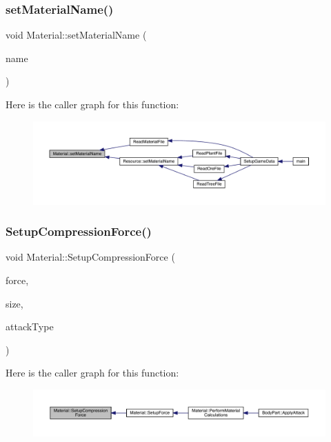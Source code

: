 \subsubsection{\texorpdfstring{set\+Material\+Name()}{setMaterialName()}}
{\footnotesize\ttfamily void Material\+::set\+Material\+Name (\begin{DoxyParamCaption}\item[{std\+::string}]{name }\end{DoxyParamCaption})}

Here is the caller graph for this function\+:
\nopagebreak
\begin{figure}[H]
\begin{center}
\leavevmode
\includegraphics[width=350pt]{class_material_ab73b88e094cf38d28f9addfd12357b04_icgraph}
\end{center}
\end{figure}
\mbox{\label{class_material_a9fa7b190d0621069612e848150e780ee}} 
\subsubsection{\texorpdfstring{Setup\+Compression\+Force()}{SetupCompressionForce()}}
{\footnotesize\ttfamily void Material\+::\+Setup\+Compression\+Force (\begin{DoxyParamCaption}\item[{float}]{force,  }\item[{float}]{size,  }\item[{\mbox{\hyperlink{_enum_types_8hpp_a904b2f9c8f3951116c343784c59d6afe}{Attack\+Type}}}]{attack\+Type }\end{DoxyParamCaption})\hspace{0.3cm}{\ttfamily [private]}}

Here is the caller graph for this function\+:
\nopagebreak
\begin{figure}[H]
\begin{center}
\leavevmode
\includegraphics[width=350pt]{class_material_a9fa7b190d0621069612e848150e780ee_icgraph}
\end{center}
\end{figure}
\mbox{\label{class_material_aa2951eaa13d1f8137cc228ccc9b0c33c}} 

